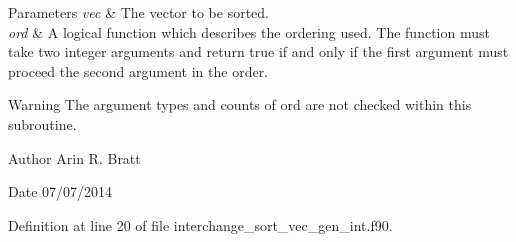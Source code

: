 \begin{DoxyParams}{Parameters}
{\em vec} & The vector to be sorted.\\
\hline
{\em ord} & A logical function which describes the ordering used. The function must take two integer arguments and return true if and only if the first argument must proceed the second argument in the order.\\
\hline
\end{DoxyParams}
\begin{DoxyWarning}{Warning}
The argument types and counts of ord are not checked within this subroutine.
\end{DoxyWarning}
\begin{DoxyAuthor}{Author}
Arin R. Bratt 
\end{DoxyAuthor}
\begin{DoxyDate}{Date}
07/07/2014 
\end{DoxyDate}


Definition at line 20 of file interchange\-\_\-sort\-\_\-vec\-\_\-gen\-\_\-int.\-f90.

